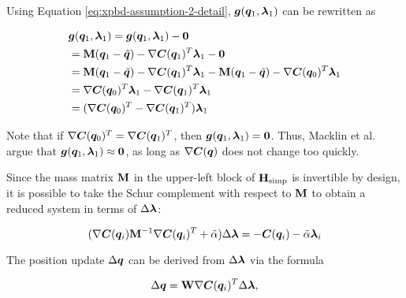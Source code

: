\noindent Using Equation \ref{eq:xpbd-assumption-2-detail}, $\bm{g}(\bm{q}_1, \bm{\lambda}_1)$ can be rewritten as

\begin{equation}
\begin{split}
    &\bm{g}(\bm{q}_1, \bm{\lambda}_1) = \bm{g}(\bm{q}_1, \bm{\lambda}_1) - \bm{0} \\
    &= \mathbf{M}(\bm{q}_1 - \tilde{\bm{q}}) - \nabla \bm{C}(\bm{q}_1)^T \bm{\lambda}_1 - \bm{0} \\
    &= \mathbf{M}(\bm{q}_1 - \tilde{\bm{q}}) - \nabla \bm{C}(\bm{q}_1)^T \bm{\lambda}_1 
    - \mathbf{M}(\bm{q}_1 - \tilde{\bm{q}}) - \nabla \bm{C}(\bm{q}_0)^T \bm{\lambda}_1 \\
    &= \nabla \bm{C}(\bm{q}_0)^T \bm{\lambda}_1 - \nabla \bm{C}(\bm{q}_1)^T \bm{\lambda}_1 \\
    &= (\nabla \bm{C}(\bm{q}_0)^T - \nabla \bm{C}(\bm{q}_1)^T) \bm{\lambda}_1
\end{split}
\end{equation}

\noindent Note that if $\nabla \bm{C}(\bm{q}_0)^T = \nabla \bm{C}(\bm{q}_1)^T$, then 
$\bm{g}(\bm{q}_1, \bm{\lambda}_1) = \bm{0}$. Thus, Macklin et al.\ \cite{macklin2016} argue that 
$\bm{g}(\bm{q}_1, \bm{\lambda}_1) \approx \bm{0}$, as long as $\nabla \bm{C}(\bm{q})$ 
does not change too quickly.

Since the mass matrix $\mathbf{M}$ in the upper-left block of $\mathbf{H}_{\text{simp}}$ is invertible by design, it is possible
to take the Schur complement with respect to $\mathbf{M}$ to obtain a reduced system in terms of $\Delta \bm{\lambda}$:

\begin{equation}\label{eq:xpbd-schur}
    (\nabla \bm{C}(\bm{q}_i) \mathbf{M}^{-1} \nabla \bm{C}(\bm{q}_i)^T + \tilde{\mathbf{\alpha}}) \Delta \bm{\lambda} = -\bm{C}(\bm{q}_i) - 
    \tilde{\mathbf{\alpha}}\bm{\lambda}_i
\end{equation}

\noindent The position update $\Delta \bm{q}$ can be derived from $\Delta \bm{\lambda}$ via the formula

\begin{equation}\label{eq:xpbd-position-update}
    \Delta \bm{q} = \mathbf{W} \nabla \bm{C}(\bm{q}_i)^T \Delta \bm{\lambda},
\end{equation}

